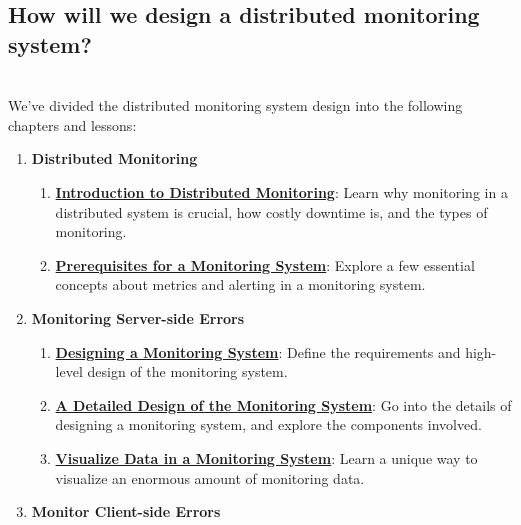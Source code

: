 \subsection{How will we design a distributed monitoring system?}\label{I72dScBJatbw98ZmVQ3no}
\\
We've divided the distributed monitoring system design into the following chapters and lessons:

\begin{enumerate}
\item
\protect{}\label{pqA2-6yxSM_c0uk-Ptog5}
\textbf{Distributed Monitoring}

\begin{enumerate}
\item
\href{https://www.educative.io/courses/grokking-the-system-design-interview/introduction-to-distributed-monitoring}{\textbf{Introduction to Distributed Monitoring}}: Learn why monitoring in a distributed system is crucial, how costly downtime is, and the types of monitoring.
\item
\href{https://www.educative.io/courses/grokking-the-system-design-interview/prerequisites-of-a-monitoring-system}{\textbf{Prerequisites for a Monitoring System}}: Explore a few essential concepts about metrics and alerting in a monitoring system.
\end{enumerate}
\item
\protect{}\label{Jmh98MHsOwhNPkFrJrIZN}
\textbf{Monitoring Server-side Errors}

\begin{enumerate}
\item
\href{https://www.educative.io/courses/grokking-the-system-design-interview/design-of-a-monitoring-system}{\textbf{Designing a Monitoring System}}: Define the requirements and high-level design of the monitoring system.
\item
\href{https://www.educative.io/courses/grokking-the-system-design-interview/detailed-design-of-a-monitoring-system}{\textbf{A Detailed Design of the Monitoring System}}: Go into the details of designing a monitoring system, and explore the components involved.
\item
\href{https://www.educative.io/courses/grokking-the-system-design-interview/visualize-data-in-a-monitoring-system}{\textbf{Visualize Data in a Monitoring System}}: Learn a unique way to visualize an enormous amount of monitoring data.
\end{enumerate}
\item
\protect{}\label{HIJFCdxYORcc__-hY3ycE}
\textbf{Monitor Client-side Errors}


\end{enumerate}
